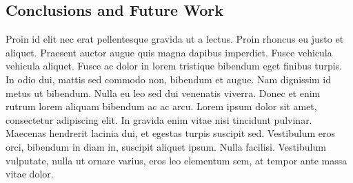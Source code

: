 \documentclass{article}
\begin{document}
\begin{multicols}{2}
	\section{Conclusions and Future Work}
	Proin id elit nec erat pellentesque gravida ut a lectus. Proin rhoncus eu justo et aliquet. Praesent auctor augue quis magna dapibus imperdiet. Fusce vehicula vehicula aliquet. Fusce ac dolor in lorem tristique bibendum eget finibus turpis. In odio dui, mattis sed commodo non, bibendum et augue. Nam dignissim id metus ut bibendum. Nulla eu leo sed dui venenatis viverra. Donec et enim rutrum lorem aliquam bibendum ac ac arcu. Lorem ipsum dolor sit amet, consectetur adipiscing elit. In gravida enim vitae nisi tincidunt pulvinar. Maecenas hendrerit lacinia dui, et egestas turpis suscipit sed. Vestibulum eros orci, bibendum in diam in, suscipit aliquet ipsum. Nulla facilisi. Vestibulum vulputate, nulla ut ornare varius, eros leo elementum sem, at tempor ante massa vitae dolor.	
	
    
    
	
	\end{multicols}
\end{document}
